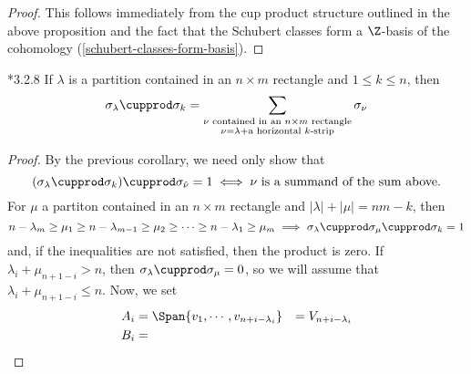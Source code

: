 \documentclass[11pt,leqno,oneside]{amsart}
\numberwithin{thm}{section}
\begin{document}
\begin{proof}
  This follows immediately from the cup product structure outlined in
  the above proposition and the fact that the Schubert classes form a
  \(\Z\)-basis of the cohomology (\ref{schubert-classes-form-basis}).
\end{proof}
\begin{thm}
  \cite{manivel}*{3.2.8} If \(\lambda\) is a partition contained in an
  \(n \times m\) rectangle and \(1 \leq k \leq n\), then \[
    \sigma_\lambda \cupprod \sigma_k = \sum_{\substack{\nu \text{
          contained in an }n\times m\text{ rectangle} \\ \nu = \lambda
        + \text{a horizontal }k\text{-strip}}} \sigma_\nu
  \]
\end{thm}
\begin{proof}
  By the previous corollary, we need only show that \[
    (\sigma_\lambda \cupprod \sigma_k) \cupprod \sigma_{\hat{\nu}} = 1
    \iff \nu \text{ is a summand of the sum above.}
  \]
  For \(\mu\) a partiton contained in an \(n \times m\) rectangle and
  \(|\lambda|+|\mu| = nm-k\), then \[
    n-\lambda_m \geq \mu_1 \geq n-\lambda_{m-1} \geq \mu_2 \geq \cdots
    \geq n-\lambda_1 \geq \mu_m \implies \sigma_\lambda \cupprod
    \sigma_\mu \cupprod \sigma_k = 1
  \]
  and, if the inequalities are not satisfied, then the product is
  zero. If \(\lambda_i + \mu_{n+1-i} > n\), then \(\sigma_\lambda
  \cupprod \sigma_\mu = 0\), so we will assume that \(\lambda_i +
  \mu_{n+1-i} \leq n\). Now, we set
  \begin{align*}
    A_i & = \Span\{v_1, \cdots, v_{n+i-\lambda_i}\}
    & = V_{n+i-\lambda_i} \\
    B_i & = 
  \end{align*}
\end{proof}
\begin{bibdiv}
  \begin{biblist}
  \end{biblist}
\end{bibdiv}
\end{document}
